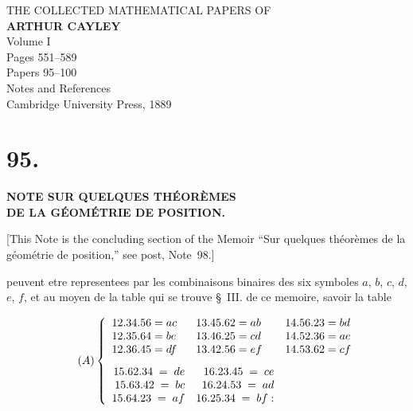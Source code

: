 \documentclass[11pt,a4paper]{book}
\begin{document}
\thispagestyle{empty}
\begin{titlepage}
\begin{center}
\vspace*{2cm}
{\Large THE COLLECTED MATHEMATICAL PAPERS OF}\\[1em]
{\LARGE\bfseries ARTHUR CAYLEY}\\[2em]
{\Large Volume I}\\[1em]
{\large Pages 551--589}\\[0.5em]
{\large Papers 95--100}\\[0.5em]
{\large Notes and References}\\[2em]
{\normalsize Cambridge University Press, 1889}
\end{center}
\end{titlepage}

\newpage
\setcounter{page}{551}

\section*{95.}

\begin{center}
{\Large\bfseries NOTE SUR QUELQUES TH\'{E}OR\`{E}MES\\DE LA G\'{E}OM\'{E}TRIE DE POSITION.}
\end{center}


[This Note is the concluding section of the Memoir ``Sur quelques th\'{e}or\`{e}mes de la g\'{e}om\'{e}trie de position,'' see post, Note~98.]

\medskip

peuvent etre representees par les combinaisons binaires des six symboles $a$, $b$, $c$, $d$, $e$, $f$, et au moyen de la table qui se trouve \S~III. de ce memoire, savoir la table

\begin{equation}
\tag{$A$}
\left\{
\begin{array}{r@{\;=\;}l r@{\;=\;}l r@{\;=\;}l}
12.34.56 & ac & 13.45.62 & ab & 14.56.23 & bd \\
12.35.64 & be & 13.46.25 & cd & 14.52.36 & ae \\
12.36.45 & df & 13.42.56 & ef & 14.53.62 & cf \\[0.8em]
\multicolumn{2}{r}{15.62.34\;=\;de} & \multicolumn{2}{r}{16.23.45\;=\;ce} \\
\multicolumn{2}{r}{15.63.42\;=\;bc} & \multicolumn{2}{r}{16.24.53\;=\;ad} \\
\multicolumn{2}{r}{15.64.23\;=\;af} & \multicolumn{2}{r}{16.25.34\;=\;bf:}
\end{array}
\right.
\end{equation}
\end{document}
